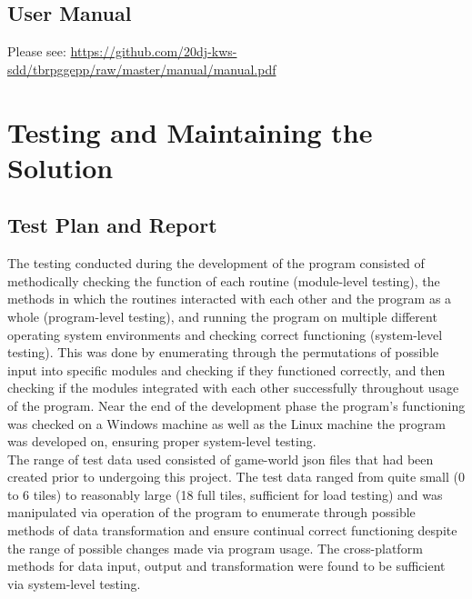 \documentclass{article} \usepackage[margin=1in,headheight=57pt,headsep=0.1in]{geometry}
\begin{document}
\subsection{User Manual}
Please see: \url{https://github.com/20dj-kws-sdd/tbrpggepp/raw/master/manual/manual.pdf}
\newpage
\section{Testing and Maintaining the Solution}
\subsection{Test Plan and Report}
The testing conducted during the development of the program consisted of methodically checking the function of each routine (module-level testing), the methods in which the routines interacted with each other and the program as a whole (program-level testing), and running the program on multiple different operating system environments and checking correct functioning (system-level testing). This was done by enumerating through the permutations of possible input into specific modules and checking if they functioned correctly, and then checking if the modules integrated with each other successfully throughout usage of the program. Near the end of the development phase the program's functioning was checked on a Windows machine as well as the Linux machine the program was developed on, ensuring proper system-level testing. \\

The range of test data used consisted of game-world json files that had been created prior to undergoing this project. The test data ranged from quite small (0 to 6 tiles) to reasonably large (18 full tiles, sufficient for load testing) and was manipulated via operation of the program to enumerate through possible methods of data transformation and ensure continual correct functioning despite the range of possible changes made via program usage. The cross-platform methods for data input, output and transformation were found to be sufficient via system-level testing. \\
\end{document}

